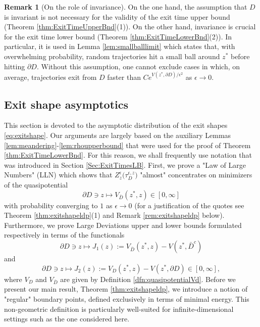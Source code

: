 \documentclass[10pt, reqno]{amsart}
\theoremstyle{definition}
\newtheorem{rem}{Remark}
\numberwithin{lem}{section}
\numberwithin{cor}{section}
\numberwithin{prop}{section}
\numberwithin{thm}{section}
\numberwithin{dfn}{section}
\begin{document}
\begin{rem}[On the role of invariance]\label{rem:invariance} On the one hand, the assumption that $D$ is invariant is not necessary for the validity of the exit time upper bound (Theorem \ref{thm:ExitTimeUpperBnd}(1)). On the other hand, invariance is crucial for the exit time lower bound (Theorem \ref{thm:ExitTimeLowerBnd}(2)). In particular, it is used in Lemma \ref{lem:smallballlimit} which states that, with overwhelming probability, random trajectories hit a small ball around $z^*$ before hitting $\partial D$. Without this assumption, one cannot exclude cases in which, on average, trajectories exit from $D$ faster than $Ce^{V(z^*,\partial D)/\epsilon^2}$ as $\epsilon\to0.$ 
\end{rem}


 \subsection{Exit shape asymptotics}\label{Sec:ExitShapes} This section is devoted to the asymptotic distribution of the exit shapes \eqref{eq:exitshape}. Our arguments are largely based on the auxiliary Lemmas \ref{lem:meandering}-\ref{lem:rhoupperbound} that were used for the proof of Theorem \ref{thm:ExitTimeLowerBnd}. For this reason, we shall frequently use notation that was introduced in Section \ref{Sec:ExitTimesLB}. First, we prove a "Law of Large Numbers" (LLN) which shows that $ Z_z^\epsilon\big( \tau_D^{\epsilon, z}  \big)$ "almost" concentrates on minimizers of the quasipotential $$\partial D\ni z\longmapsto V_{\bar{D}}(z^*, z)\in[0,\infty]$$
 with probability converging to $1$ as $\epsilon\to 0$ (for a justification of the quotes see Theorem \ref{thm:exitshapeldp}(1) and Remark \ref{rem:exitshapeldp} below). Furthermore, we prove Large Deviations upper and lower bounds formulated respectively in terms of the functionals \begin{equation}\label{eq:J1definition}
     \partial D\ni z\longmapsto J_1(z):=V_{\bar{D}}(z^*, z)-V(z^*,\bar{D}^c)
 \end{equation}
and
 \begin{equation}\label{eq:J2definition}
     \partial D\ni z\longmapsto J_2(z):=V_D(z^*, z)-V(z^*,\partial D)\in [0,\infty],
 \end{equation}
  where $V_D$ and $V_{\bar{D}}$ are given by Definition \ref{dfn:quasipotentialVd}.
 Before we present our main result, Theorem \ref{thm:exitshapeldp}, we introduce a notion of "regular" boundary points, defined exclusively in terms of minimal energy. This non-geometric definition is particularly well-suited for infinite-dimensional settings such as the one considered here. 
\end{document}
